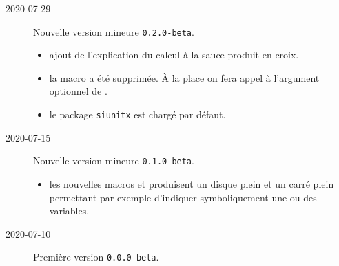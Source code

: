 \documentclass[12pt,a4paper]{article}
\begin{document}
\begin{description}
    \medskip
    \item[2020-07-29] Nouvelle version mineure \verb+0.2.0-beta+.
    
    \begin{itemize}[itemsep=.5em]
        \item {} ajout de l'explication du calcul à la sauce produit en croix.
    
    
        \item {} la macro  a été supprimée. À la place on fera appel à l'argument optionnel de .
    
    
        \item {} le package \verb#siunitx# est chargé par défaut.
    \end{itemize}
    
    \separation


    \medskip
    \item[2020-07-15] Nouvelle version mineure \verb+0.1.0-beta+.
    
    \begin{itemize}[itemsep=.5em]
        \item {} les nouvelles macros  et  produisent un disque plein et un carré plein permettant par exemple d'indiquer symboliquement une ou des variables.
    \end{itemize}
    
    \separation


    \medskip
    \item[2020-07-10] Première version \verb+0.0.0-beta+.

\end{description}
\end{document}
